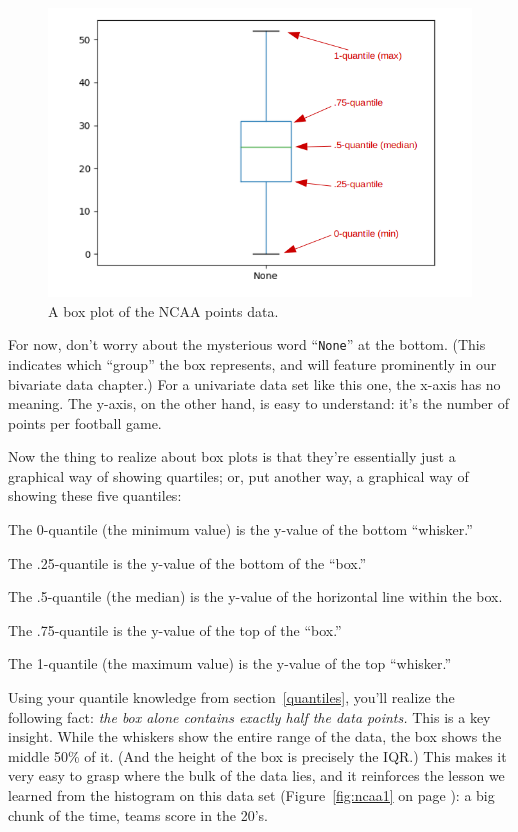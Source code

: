 \begin{figure}[ht]
\centering
\includegraphics[width=1\textwidth]{ncaaboxAnnotated.png}
\caption{A box plot of the NCAA points data.}
\label{fig:ncaaBox}
\end{figure}

For now, don't worry about the mysterious word ``\texttt{None}'' at the bottom.
(This indicates which ``group'' the box represents, and will feature
prominently in our bivariate data chapter.) For a univariate data set like this
one, the x-axis has no meaning. The y-axis, on the other hand, is easy to
understand: it's the number of points per football game.


Now the thing to realize about box plots is that they're essentially just a
graphical way of showing quartiles; or, put another way, a graphical way of
showing these five quantiles:

\begin{compactitem}
\item The 0-quantile (the minimum value) is the y-value of the bottom ``whisker.''
\item The .25-quantile is the y-value of the bottom of the ``box.''
\item The .5-quantile (the median) is the y-value of the horizontal line within
the box.
\item The .75-quantile is the y-value of the top of the ``box.''
\item The 1-quantile (the maximum value) is the y-value of the top ``whisker.''
\end{compactitem}

Using your quantile knowledge from section~\ref{quantiles}, you'll realize the
following fact: \textit{the box alone contains exactly half the data points.}
This is a key insight. While the whiskers show the entire range of the data,
the box shows the middle 50\% of it. (And the height of the box is precisely
the IQR.) This makes it very easy to grasp where the bulk of the data lies, and
it reinforces the lesson we learned from the histogram on this data set
(Figure~\ref{fig:ncaa1} on page \pageref{fig:ncaa1}): a big chunk of the time,
teams score in the 20's.

